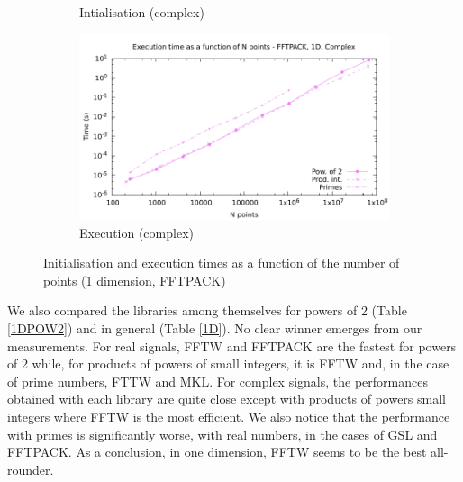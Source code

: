 \documentclass[12pt, a4paper]{article}
\begin{document}
\begin{figure}[H]
\begin{subfigure}{.5\textwidth}
\caption{Intialisation (complex)}
\label{1DFFTPACKCI}
\end{subfigure}%
\begin{subfigure}{.5\textwidth}
\centering
\includegraphics[width=.9\linewidth]{graphs/1d-fftpack-exec-c.pdf}
\caption{Execution (complex)}
\label{1DFFTPACKC}
\end{subfigure}
\caption{Initialisation and execution times as a function of the number of points (1 dimension, FFTPACK)}
\label{1DFFTPACK}
\end{figure}

We also compared the libraries among themselves for powers of 2 (Table \ref{1DPOW2}) and in general (Table \ref{1D}).  No clear winner emerges from our measurements. For real signals, FFTW and FFTPACK are the fastest for powers of 2 while, for products of powers of small integers, it is FFTW and, in the case of prime numbers, FTTW and MKL. For complex signals, the performances obtained with each library are quite close except with products of powers small integers where FFTW is the most efficient. We also notice that the performance with primes is significantly worse, with real numbers, in the cases of GSL and FFTPACK. As a conclusion, in one dimension, FFTW seems to be the best all-rounder.
\end{document}
